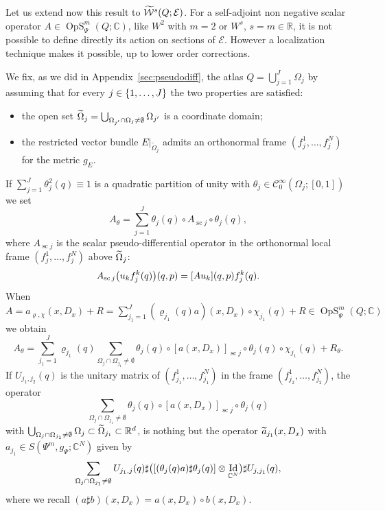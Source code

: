 \documentclass[10pt]{amsart}
\theoremstyle{definition}\newtheorem{defi}[theo]{Definition}\newtheorem{rema}[theo]{Remark}\newtheorem{exam}[theo]{Example}\newtheorem{exem}[theo]{Example}\newtheorem{nota}[theo]{Notation}
\newcommand{\C}{\mathbb{C}}
\newcommand{\R}{\mathbb{R}}
\newcommand{\clW}{\mathcal{W}}
\newcommand{\clC}{\mathcal{C}}
\newcommand{\clE}{\mathcal{E}}
\DeclareMathOperator{\OpS}{OpS}
\DeclareMathOperator{\Idd}{Id}
\DeclareMathOperator{\scc}{sc}
\let\oldtilde\tilde
\renewcommand*{\tilde}[1]{\mathchoice{\widetilde{#1}}{\widetilde{#1}}{\oldtilde{#1}}{\oldtilde{#1}}}
\let\originalleft\left
\let\originalright\right
\renewcommand{\left}{\mathopen{}\mathclose\bgroup\originalleft}
\renewcommand{\right}{\aftergroup\egroup\originalright}
\begin{document}
Let us extend now this result to $\tilde{\clW}^{s}(Q;\clE)$. For a self-adjoint non negative scalar operator $A\in \OpS^{m}_{\Psi}(Q;\C)$, like $W^{2}$ with $m=2$ or $W^{s}$, $s=m\in \R$, it is not possible to define directly its action on sections of $\clE$. However a localization technique makes it possible, up to lower order corrections.

We fix, as we did in Appendix~\ref{sec:pseudodiff}, the atlas $Q=\bigcup_{j=1}^{J}\Omega_{j}$ by assuming that for every $j\in \left\{1,\dots, J\right\}$ the two properties are satisfied:
\begin{itemize}
\item the open set $\tilde{\Omega}_{j}=\bigcup_{\Omega_{j'}\cap \Omega_{j}\neq \emptyset}\Omega_{j'}$ is a coordinate domain;
\item the restricted vector bundle $E|_{\widetilde{\Omega}_{j}}$ admits an orthonormal frame $(f_{j}^{1},\dots,f_{j}^{N})$ for the metric $g_{E}$.
\end{itemize}
If $\sum_{j=1}^{J}\theta_{j}^{2}(q)\equiv 1$ is a quadratic partition of unity with $\theta_{j}\in \clC^{\infty}_{0}(\Omega_{j};[0,1])$ we set
\[
A_{\theta}=\sum_{j=1}^{J}\theta_{j}(q)\circ A_{\scc j}\circ \theta_{j}(q),
\]
where $A_{\scc j}$ is the scalar pseudo-differential operator in the orthonormal local frame $(f_{j}^{1},\dots,f_{j}^{N})$ above $\tilde{\Omega}_{j}$:
\[
A_{\scc j}\left(u_{k}f_{j}^{k}(q)\right)(q,p) =[Au_{k}](q,p)f_{j}^{k}(q).
\]
When $A=a_{\varrho,\chi}(x,D_{x})+R=\sum_{j_{1}=1}^{J}(\varrho_{j_{1}}(q)a)(x,D_{x})\circ\chi_{j_{1}}(q)+R\in \OpS^{m}_{\Psi}(Q;\C)$\linebreak we obtain
\[
A_{\theta}=\sum_{j_{1}=1}^{J}\varrho_{j_{1}}(q)\sum_{\Omega_{j}\cap \Omega_{j_{1}}\neq\emptyset }\theta_{j}(q)\circ [a(x,D_{x})]_{\scc j}\circ \theta_{j}(q)\circ \chi_{j_{1}}(q)+R_{\theta}.
\]
If $U_{j_{1},j_{2}}(q)$ is the unitary matrix of $(f_{j_{1}}^{1},\dots, f_{j_{1}}^{N})$ in the frame $(f_{j_{2}}^{1},\dots, f_{j_{2}}^{N})$, the operator
\[
\sum_{\Omega_{j}\cap \Omega_{j_{1}}\neq\emptyset}
\theta_{j}(q)\circ [a(x,D_{x})]_{\scc j}\circ \theta_{j}(q)
\]
with $\bigcup_{\Omega_{j}\cap \Omega_{j_{1}}\neq \emptyset}\Omega_{j}\subset \tilde{\Omega}_{j_{1}}\subset \R^{d}$, is nothing but the operator $\tilde{a}_{j_{1}}(x,D_{x})$ with $a_{j_{1}}\in S(\Psi^{m},g_{\Psi};\C^{N})$ given by
\[
\sum_{\Omega_{j}\cap \Omega_{j_{1}}\neq \emptyset} U_{j_{1},j}(q)\sharp \bigl(\left[(\theta_{j}(q)a)\sharp \theta_{j}(q)\right]\otimes \Idd_{\C^{N}}\bigr)\sharp U_{j,j_{1}}(q),
\]
where we recall $(a\sharp b)(x,D_{x})=a(x,D_{x})\circ b(x,D_{x})$.
\end{document}

